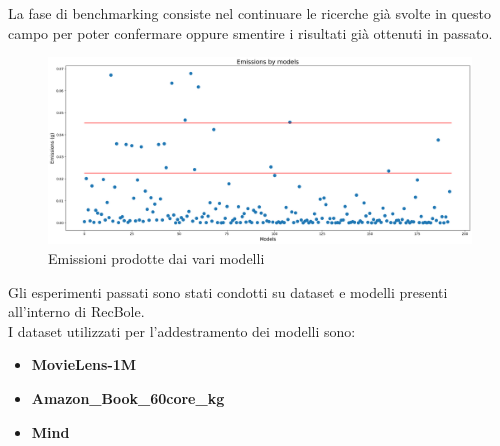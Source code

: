 La fase di benchmarking consiste nel continuare le ricerche già svolte in questo campo per poter confermare oppure smentire i risultati già ottenuti in passato.\\
\begin{figure}[H]
    \centering
    \includegraphics[width=\textwidth]{images/situazione-attuale.png}
    \caption{Emissioni prodotte dai vari modelli}
\end{figure}

\noindent Gli esperimenti passati sono stati condotti su dataset e modelli presenti all'interno di RecBole.\\I dataset utilizzati per l'addestramento dei modelli sono:
\begin{itemize}
    \item \textbf{MovieLens-1M}
    \item \textbf{Amazon\_Book\_60core\_kg} 
    \item \textbf{Mind}
\end{itemize}

